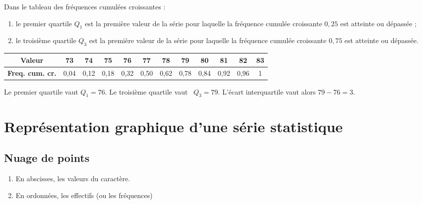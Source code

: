 Dans le tableau des fréquences cumulées croissantes :
\begin{enumerate}
\item le premier quartile $Q_1$ est la première valeur de la série
  pour laquelle la fréquence cumulée croissante $0,25$ est atteinte ou
  dépassée ;
\item le troisième quartile $Q_3$ est la première valeur de la série
  pour laquelle la fréquence cumulée croissante $0,75$ est atteinte ou
  dépassée.
\end{enumerate}


\begin{center}
\begin{tabular}[h]{|c||c|c|c|c|c|c|c|c|c|c|c|}
    \hline
  \textbf{Valeur} & 73 & 74 & 75 & 76 & 77 & 78 & 79 & 80 & 81 &
  82 & 83 \\
  \hline
  \textbf{Freq. cum. cr.} & 0,04 & 0,12 & 0,18 & 0,32 & 0,50 & 0,62 & 0,78 &
  0,84 & 0,92 & 0,96 & 1 \\ 
  \hline
\end{tabular}
\end{center}

Le premier quartile vaut $Q_1=76$. Le troisième quartile vaut \ $Q_3=79$. L'écart interquartile vaut alors \( 79-76=3\).



\section{Représentation graphique d'une série statistique}


\begin{multicols}{2}
\subsection{Nuage de points}
  \begin{enumerate}
  \item En abscisses, les valeurs du caractère.
  \item En ordonnées, les effectifs (ou les fréquences)
  \end{enumerate}
  \columnbreak
\end{multicols}

